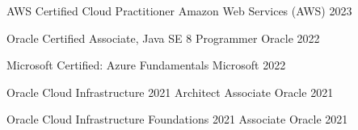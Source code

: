 

\begin{cvhonors}

  \cvhonor
    {AWS Certified Cloud Practitioner} %
    {Amazon Web Services (AWS)} %
    {} %
    {2023} %

  \cvhonor
    {Oracle Certified Associate, Java SE 8 Programmer} %
    {Oracle} %
    {} %
    {2022} %

  \cvhonor
    {Microsoft Certified: Azure Fundamentals} %
    {Microsoft} %
    {} %
    {2022} %

  \cvhonor
    {Oracle Cloud Infrastructure 2021 Architect Associate} %
    {Oracle} %
    {} %
    {2021} %

  \cvhonor
    {Oracle Cloud Infrastructure Foundations 2021 Associate} %
    {Oracle} %
    {} %
    {2021} %

\end{cvhonors}
